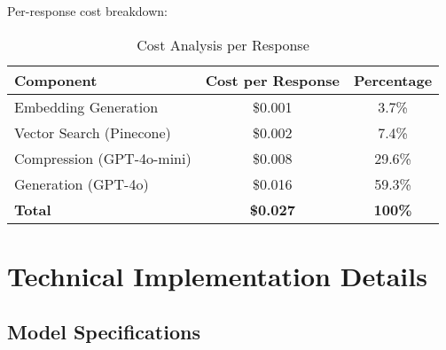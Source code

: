 \documentclass[11pt,a4paper]{article}
\begin{document}
Per-response cost breakdown:

\begin{table}[h]
\centering
\begin{tabular}{@{}lcc@{}}
\toprule
Component & Cost per Response & Percentage \\
\midrule
Embedding Generation & \$0.001 & 3.7\% \\
Vector Search (Pinecone) & \$0.002 & 7.4\% \\
Compression (GPT-4o-mini) & \$0.008 & 29.6\% \\
Generation (GPT-4o) & \$0.016 & 59.3\% \\
\midrule
\textbf{Total} & \textbf{\$0.027} & \textbf{100\%} \\
\bottomrule
\end{tabular}
\caption{Cost Analysis per Response}
\end{table}

\section{Technical Implementation Details}

\subsection{Model Specifications}
\end{document}

